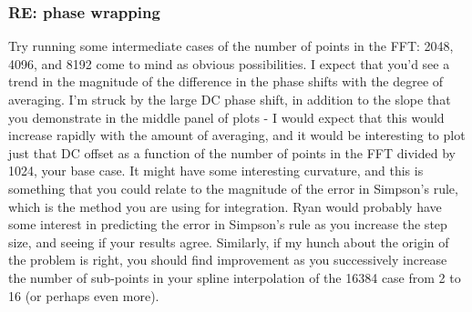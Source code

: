 \documentclass[crop=false,class=article,oneside]{standalone}
\begin{document}
\subsubsection{\footnotesize RE: phase wrapping}
Try running some intermediate cases of the number of points in the FFT: 2048, 4096, and 8192 come to mind as obvious possibilities. I expect that you'd see a trend in the magnitude of the difference in the phase shifts with the degree of averaging. I'm struck by the large DC phase shift, in addition to the slope that you demonstrate in the middle panel of plots - I would expect that this would increase rapidly with the amount of averaging, and it would be interesting to plot just that DC offset as a function of the number of points in the FFT divided by 1024, your base case. It might have some interesting curvature, and this is something that you could relate to the magnitude of the error in Simpson's rule, which is the method you are using for integration. Ryan would probably have some interest in predicting the error in Simpson's rule as you increase the step size, and seeing if your results agree. Similarly, if my hunch about the origin of the problem is right, you should find improvement as you successively increase the number of sub-points in your spline interpolation of the 16384 case from 2 to 16 (or perhaps even more).
\end{document}
